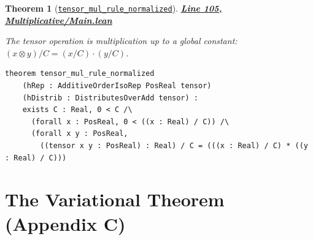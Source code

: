 \documentclass[11pt]{article}
\newtheorem{theorem}{Theorem}[section]
\theoremstyle{definition}
\theoremstyle{remark}
\begin{document}
\begin{center}
\end{center}

\begin{theorem}[\href{https://github.com/zariuq/ks-foundations-of-inference/blob/main/KnuthSkilling/Multiplicative/Main.lean\#L105}{\texttt{tensor\_mul\_rule\_normalized}}]
\textbf{\href{https://github.com/zariuq/ks-foundations-of-inference/blob/main/KnuthSkilling/Multiplicative/Main.lean\#L105}{Line 105, Multiplicative/Main.lean}}

The tensor operation is multiplication up to a global constant:
$(x \otimes y) / C = (x/C) \cdot (y/C)$.
\end{theorem}

\begin{lstlisting}[caption={Product rule (normalized)}]
theorem tensor_mul_rule_normalized
    (hRep : AdditiveOrderIsoRep PosReal tensor)
    (hDistrib : DistributesOverAdd tensor) :
    exists C : Real, 0 < C /\
      (forall x : PosReal, 0 < ((x : Real) / C)) /\
      (forall x y : PosReal,
        ((tensor x y : PosReal) : Real) / C = (((x : Real) / C) * ((y : Real) / C)))
\end{lstlisting}

\section{The Variational Theorem (Appendix C)}
\end{document}
